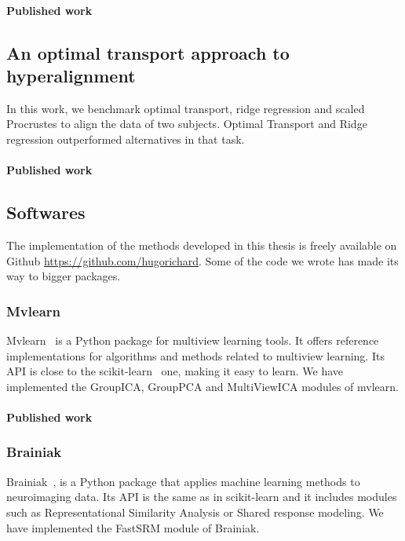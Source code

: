\documentclass[ twoside,openright,titlepage,numbers=noenddot,%
                headinclude,footinclude,cleardoublepage=empty,abstract=on,
                BCOR=5mm,paper=a4,fontsize=11pt, 
                ]{scrreprt}
\begin{document}
  
\paragraph{Published work}

\subsection{An optimal transport approach to hyperalignment}
In this work, we benchmark optimal transport, ridge regression and scaled
Procrustes to align the data of two
subjects. Optimal Transport and Ridge regression outperformed alternatives in that task.

\paragraph{Published work}


\subsection{Softwares}
The implementation of the methods developed in this thesis is freely available on Github \url{https://github.com/hugorichard}. Some of the code we wrote has made its way to bigger packages. 

\subsubsection{Mvlearn}
Mvlearn~\cite{perry2020mvlearn} is a Python package for multiview learning tools. It offers reference
implementations for algorithms and methods related to multiview learning.
Its API is close to the scikit-learn~\cite{abraham2014machine} one, making it
easy to learn.
We have implemented the GroupICA, GroupPCA and MultiViewICA modules of mvlearn.

\paragraph{Published work}



\subsubsection{Brainiak}
Brainiak~\cite{kumar2020brainiak}, is a Python package that applies machine
learning methods to neuroimaging data. Its API is the same as in scikit-learn
and it includes modules such as Representational Similarity Analysis or Shared
response modeling.
We have implemented the FastSRM module of Brainiak.
\end{document}
